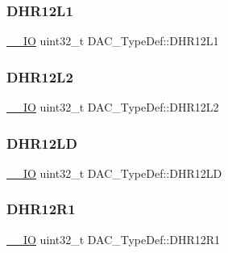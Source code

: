 \mbox{\label{struct_d_a_c___type_def_a5eb63912e39085e3e13d64bdb0cf38bd}} 
\subsubsection{\texorpdfstring{DHR12L1}{DHR12L1}}
{\footnotesize\ttfamily \mbox{\hyperlink{group___c_m_s_i_s___c_m3__core__definitions_gaec43007d9998a0a0e01faede4133d6be}{\+\_\+\+\_\+\+IO}} uint32\+\_\+t D\+A\+C\+\_\+\+Type\+Def\+::\+D\+H\+R12\+L1}

\mbox{\label{struct_d_a_c___type_def_a9f612b6b3e065e810e5a2fb254d6a40b}} 
\subsubsection{\texorpdfstring{DHR12L2}{DHR12L2}}
{\footnotesize\ttfamily \mbox{\hyperlink{group___c_m_s_i_s___c_m3__core__definitions_gaec43007d9998a0a0e01faede4133d6be}{\+\_\+\+\_\+\+IO}} uint32\+\_\+t D\+A\+C\+\_\+\+Type\+Def\+::\+D\+H\+R12\+L2}

\mbox{\label{struct_d_a_c___type_def_aea4d055e3697999b44cdcf2702d79d40}} 
\subsubsection{\texorpdfstring{DHR12LD}{DHR12LD}}
{\footnotesize\ttfamily \mbox{\hyperlink{group___c_m_s_i_s___c_m3__core__definitions_gaec43007d9998a0a0e01faede4133d6be}{\+\_\+\+\_\+\+IO}} uint32\+\_\+t D\+A\+C\+\_\+\+Type\+Def\+::\+D\+H\+R12\+LD}

\mbox{\label{struct_d_a_c___type_def_afbfd2855cdb81939b4efc58e08aaf3e5}} 
\subsubsection{\texorpdfstring{DHR12R1}{DHR12R1}}
{\footnotesize\ttfamily \mbox{\hyperlink{group___c_m_s_i_s___c_m3__core__definitions_gaec43007d9998a0a0e01faede4133d6be}{\+\_\+\+\_\+\+IO}} uint32\+\_\+t D\+A\+C\+\_\+\+Type\+Def\+::\+D\+H\+R12\+R1}

